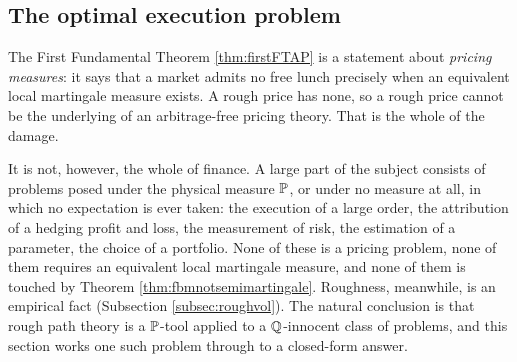 



 \subsection{The optimal execution problem}\label{subsec:execution}

 The First Fundamental Theorem \ref{thm:firstFTAP} is a statement about
\emph{pricing measures}: it says that a market admits no free lunch precisely when an equivalent
local martingale measure exists. A rough price has none, so a rough price cannot be the underlying
of an arbitrage-free pricing theory. That is the whole of the damage.

It is not, however, the whole of finance. A large part of the subject consists of problems posed
under the physical measure $\mathbb{P}$, or under no measure at all, in which no expectation is ever taken: the execution of a large order, the attribution of a hedging profit and
loss, the measurement of risk, the estimation of a parameter, the choice of a portfolio. None of
these is a pricing problem, none of them requires an equivalent local martingale measure, and none
of them is touched by Theorem \ref{thm:fbmnotsemimartingale}. Roughness, meanwhile, is an empirical
fact (Subsection \ref{subsec:roughvol}). The natural conclusion is that rough path theory is a
$\mathbb{P}$-tool applied to a $\mathbb{Q}$-innocent class of problems, and this section works one such problem
through to a closed-form answer.

